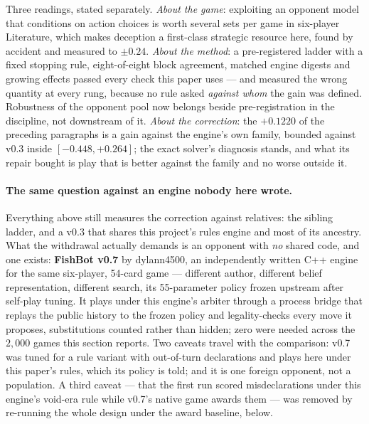 \documentclass[11pt,a4paper]{article}
\begin{document}
Three readings, stated separately. \emph{About the game}: exploiting an
opponent model that conditions on action choices is worth several sets per
game in six-player Literature, which makes deception a first-class strategic
resource here, found by accident and measured to $\pm 0.24$. \emph{About the
method}: a pre-registered ladder with a fixed stopping rule, eight-of-eight
block agreement, matched engine digests and growing effects passed every
check this paper uses --- and measured the wrong quantity at every rung,
because no rule asked \emph{against whom} the gain was defined. Robustness
of the opponent pool now belongs beside pre-registration in the discipline,
not downstream of it. \emph{About the correction}: the $+0.1220$ of the
preceding paragraphs is a gain against the engine's own family, bounded
against v0.3 inside $[-0.448, +0.264]$; the exact solver's diagnosis stands,
and what its repair bought is play that is better against the family and no
worse outside it.

\paragraph{The same question against an engine nobody here wrote.} Everything
above still measures the correction against relatives: the sibling ladder, and
a v0.3 that shares this project's rules engine and most of its ancestry. What
the withdrawal actually demands is an opponent with \emph{no} shared code, and
one exists: \textbf{FishBot v0.7} by dylann4500, an independently written
C++ engine for the same six-player, 54-card game --- different author,
different belief representation, different search, its 55-parameter policy
frozen upstream after self-play tuning. It plays under this engine's arbiter
through a process bridge that replays the public history to the frozen policy and
legality-checks every move it proposes, substitutions counted rather than
hidden; zero were needed across the $2{,}000$ games this section reports.
Two caveats travel with the comparison: v0.7 was tuned for a rule variant
with out-of-turn declarations and plays here under this paper's rules, which
its policy is told; and it is one foreign opponent, not a population. A
third caveat --- that the first run scored misdeclarations under this
engine's void-era rule while v0.7's native game awards them --- was removed
by re-running the whole design under the award baseline, below.
\end{document}

